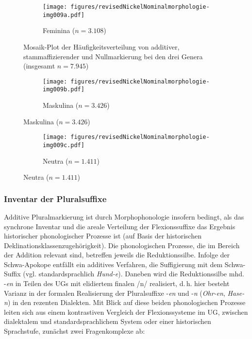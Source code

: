 \begin{figure}
\begin{subfigure}{\textwidth}\centering
\texttt{[image: figures/revisedNickelNominalmorphologie-img009a.pdf]}
\caption{Feminina ($n=3.108$)}
\label{fig:3a}
\end{subfigure}
\caption{Mosaik-Plot der Häufigkeitsverteilung von additiver, stammaffizierender und Nullmarkierung bei den drei Genera (insgesamt $n=7.945$)}
\label{fig:3}
\end{figure}
\begin{figure}\ContinuedFloat
\begin{subfigure}{\textwidth}\centering
\texttt{[image: figures/revisedNickelNominalmorphologie-img009b.pdf]}
\caption{Maskulina ($n=3.426$)}
\label{fig:3b}
\end{subfigure}
\end{figure}
\begin{figure}\ContinuedFloat
\begin{subfigure}{\textwidth}\centering
\texttt{[image: figures/revisedNickelNominalmorphologie-img009c.pdf]}
\caption{Neutra ($n=1.411$)}
\label{fig:3c}
\end{subfigure}
\end{figure}



\subsubsection{Inventar der Pluralsuffixe}
\label{sec:7.1.1.1}
Additive Pluralmarkierung ist durch Morphophonologie insofern bedingt, als das synchrone Inventar und die areale Verteilung der Flexionssuffixe das Ergebnis historischer phonologischer Prozesse ist (auf Basis der historischen Deklinationsklassenzugehörigkeit). Die phonologischen Prozesse, die im Bereich der Addition relevant sind, betreffen jeweils die Reduktionssilbe. Infolge der Schwa-Apokope entfällt ein additives Verfahren, die Suffigierung mit dem Schwa-Suffix (vgl. standardsprachlich \textit{Hund-e}). Daneben wird die Reduktionssilbe mhd. -\textit{en} in Teilen des UGs mit elidiertem finalen /n/ realisiert, d.\,h. hier besteht Varianz in der formalen Realisierung der Pluralsuffixe -\textit{en} und -\textit{n} (\textit{Ohr-en}, \textit{Hase-n}) in den rezenten Dialekten. Mit Blick auf diese beiden phonologischen Prozesse leiten sich aus einem kontrastiven Vergleich der Flexionssysteme im UG, zwischen dialektalem und standardsprachlichem System oder einer historischen Sprachstufe, zunächst zwei Fragenkomplexe ab:

